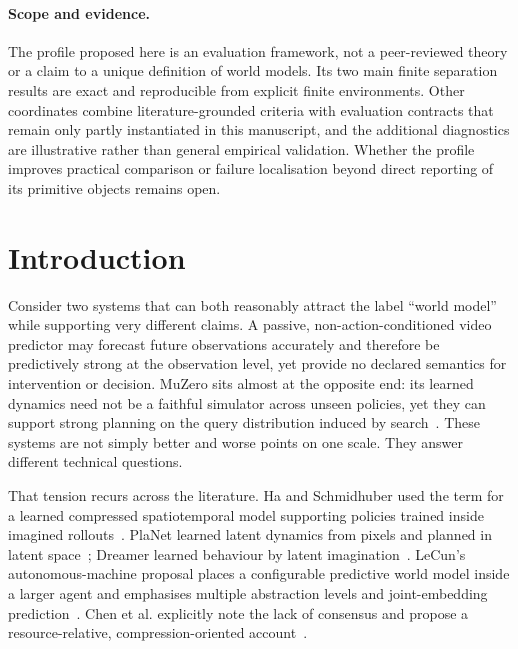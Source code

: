 \documentclass[10pt]{article}
\begin{document}
\paragraph{Scope and evidence.}
The profile proposed here is an evaluation framework, not a peer-reviewed theory or a claim to a unique definition of world models. Its two main finite separation results are exact and reproducible from explicit finite environments. Other coordinates combine literature-grounded criteria with evaluation contracts that remain only partly instantiated in this manuscript, and the additional diagnostics are illustrative rather than general empirical validation. Whether the profile improves practical comparison or failure localisation beyond direct reporting of its primitive objects remains open.

\section{Introduction}

Consider two systems that can both reasonably attract the label ``world model'' while supporting very different claims. A passive, non-action-conditioned video predictor may forecast future observations accurately and therefore be predictively strong at the observation level, yet provide no declared semantics for intervention or decision. MuZero sits almost at the opposite end: its learned dynamics need not be a faithful simulator across unseen policies, yet they can support strong planning on the query distribution induced by search~\cite{schrittwieser2020,he2024}. These systems are not simply better and worse points on one scale. They answer different technical questions.

That tension recurs across the literature. Ha and Schmidhuber used the term for a learned compressed spatiotemporal model supporting policies trained inside imagined rollouts~\cite{ha2018}. PlaNet learned latent dynamics from pixels and planned in latent space~\cite{hafner2019}; Dreamer learned behaviour by latent imagination~\cite{hafner2020}. LeCun's autonomous-machine proposal places a configurable predictive world model inside a larger agent and emphasises multiple abstraction levels and joint-embedding prediction~\cite{lecun2022}. Chen et al. explicitly note the lack of consensus and propose a resource-relative, compression-oriented account~\cite{chen2026}.
\end{document}
